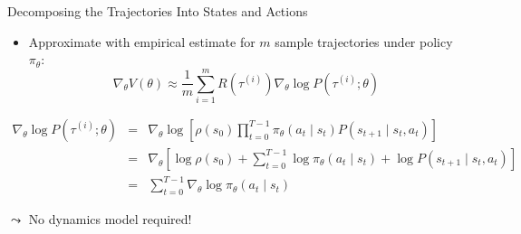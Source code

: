 \documentclass[aspectratio=169]{../latex_main/tntbeamer}  %
\begin{document}
\begin{frame}[c]{Decomposing the Trajectories Into States and Actions}
	
	\begin{itemize}
		\item Approximate with empirical estimate for $m$ sample trajectories under
		policy $\pi_\theta$:
		$$\nabla_\theta V(\theta) \approx \frac{1}{m} \sum_{i=1}^{m} R(\tau^{(i)}) \nabla_\theta \log P(\tau^{(i)}; \theta) $$
	\end{itemize}

{\footnotesize
\begin{eqnarray*}
\nabla_\theta \log P(\tau^{(i)}; \theta) &=& \nabla_\theta \log \left[ \rho(s_0) \prod_{t=0}^{T-1} \pi_\theta(a_t \mid s_t) P(s_{t+1} \mid s_t, a_t) \right]\\
&=& \nabla_\theta \left[ \log \rho(s_0) + \sum_{t=0}^{T-1} \log \pi_\theta(a_t \mid s_t) + \log P(s_{t+1}\mid s_t, a_t) \right]\\
&=& \sum_{t=0}^{T-1} \nabla_\theta \log \pi_\theta (a_t \mid s_t)
\end{eqnarray*}}
	
$\leadsto$ \alert{No dynamics model required!}
	
\end{frame}
\end{document}
